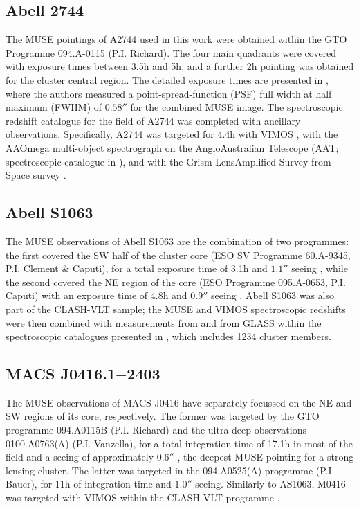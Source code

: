 \documentclass{aa}
\begin{document}
\subsection{Abell 2744}

The MUSE pointings of A2744 used in this work were obtained within the GTO Programme 094.A-0115 (P.I. Richard). The four main quadrants were covered with exposure times between 3.5h and 5h, and a further 2h pointing was obtained for the cluster central region. The detailed exposure times are presented in \cite{mahler18}, where the authors measured a point-spread-function (PSF) full width at half maximum (FWHM) of $0.58''$ for the combined MUSE image. The spectroscopic redshift catalogue for the field of A2744 was completed with ancillary observations. Specifically, A2744 was targeted for 4.4h with VIMOS \citep[PI: Böhringer, spectroscopic catalogue in][]{braglia09}, with
the AAOmega multi-object spectrograph on the AngloAustralian Telescope (AAT; spectroscopic catalogue in \citealt{owers11}), and with the Grism LensAmplified Survey from Space survey \citep[GLASS;][]{treu15,schmidt14}.


\subsection{Abell S1063}

The MUSE observations of Abell S1063 are the combination of two programmes: the first covered the SW half of the cluster core (ESO SV Programme 60.A-9345, P.I. Clement \& Caputi), for a total exposure time of 3.1h and  $1.1''$ seeing \citep{karman15}, while the second covered the NE region of the core (ESO Programme  095.A-0653, P.I. Caputi) with an exposure time of 4.8h and $0.9''$ seeing \citep{karman17}. Abell S1063 was also part of the CLASH-VLT sample; the MUSE and VIMOS spectroscopic redshifts were then combined with measurements from \cite{gomez12} and from GLASS \citep{treu16} within the spectroscopic catalogues presented in \cite{mercurio21}, which includes 1234 cluster members.

\subsection{MACS J0416.1$-$2403}

The MUSE observations of MACS J0416 have separately focussed on the NE and SW regions of its core, respectively. The former was targeted by the GTO programme 094.A0115B (P.I. Richard) and the ultra-deep observations 0100.A0763(A) (P.I. Vanzella), for a total integration time of 17.1h in most of the field and a seeing of approximately $0.6''$ \citep{vanzella21}, the deepest MUSE pointing for a strong lensing cluster. The latter was targeted in the 094.A0525(A) programme (P.I. Bauer), for 11h of integration time and $1.0''$ seeing. Similarly to AS1063, M0416 was targeted with VIMOS within the CLASH-VLT programme \citep{balestra16}.
\end{document}
